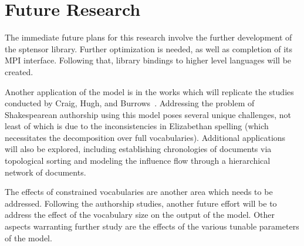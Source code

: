 \documentclass[../ut-dissertation.tex]{subfiles}
\begin{document}
\section{Future Research}
The immediate future plans for this research involve the further
development of the sptensor library.  Further optimization is needed,
as well as completion of its MPI interface.  Following that, library
bindings to higher level languages will be created.

Another application of the model is in the works which will replicate
the studies conducted by Craig, Hugh, and Burrows~\cite{burrows2017,
  craig2009}.  Addressing the problem of Shakespearean authorship
using this model poses several unique challenges, not least of which
is due to the inconsistencies in Elizabethan spelling (which
necessitates the decomposition over full vocabularies).  Additional
applications will also be explored, including establishing
chronologies of documents via topological sorting and modeling the
influence flow through a hierarchical network of documents.

The effects of constrained vocabularies are another area which needs
to be addressed.  Following the authorship studies, another future
effort will be to address the effect of the vocabulary size on the
output of the model.  Other aspects warranting further study are the
effects of the various tunable parameters of the model.  
\end{document}
